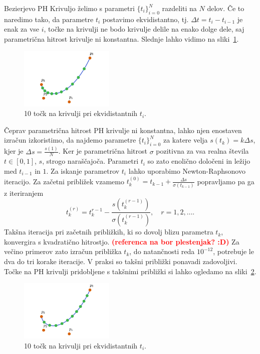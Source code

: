 \documentclass[isrm2, tisk]{fmfdelo}
\newcommand{\mycomment}[1]{\textbf{\textcolor{red}{#1}}}
\begin{document}
    Bezierjevo PH Krivuljo želimo s parametri $\{t_i\}_{i=0}^{N}$ razdeliti na $N$ delov.
    Če to naredimo tako, da parametre $t_i$ postavimo ekvidistantno, tj. $\Delta t=t_i-t_{i-1}$ je enak za vse $i$, točke na krivulji ne bodo krivulje delile na enako dolge dele, saj parametrična hitrost krivulje ni konstantna.
    Slednje lahko vidimo na sliki~\ref{fig:enakomerni-t}.
    \begin{figure}[h]
        \centering
        \includegraphics[width = 0.40\textwidth]{images/enakomerni-t}
        \caption{10 točk na krivulji pri ekvidistantnih $t_i$.}
        \label{fig:enakomerni-t}
    \end{figure}
    Čeprav parametrična hitrost PH krivulje ni konstantna, lahko njen enostaven izračun izkoristimo, da najdemo parametre $\{t_i\}^{N}_{i=0}$ za katere velja $s(t_k)=k\Delta s$, kjer je $\Delta s = \frac{s(1)}{N}$.
    Ker je parametrična hitrost $\sigma$ pozitivna za vsa realna števila $t\in[0,1]$, $s$, strogo naraščajoča.
    Parametri $t_i$ so zato enolično določeni in ležijo med $t_{i-1}$ in $1$.
    Za iskanje parametrov $t_i$ lahko uporabimo Newton-Raphsonovo iteracijo.
    Za začetni približek vzamemo $t_k^{(0)} = t_{k-1} + \frac{\Delta s}{\sigma(t_{k-1})}$ popravljamo pa ga z iteriranjem
    \[ t_k^{(r)} = t_k^{r-1} - \frac{s(t_k^{(r-1)})}{\sigma(t_k^{(r-1)})}, \quad r=1,2,\ldots .\]
    Takšna iteracija pri začetnih približkih, ki so dovolj blizu parametra $t_k$, konvergira s kvadratično hitrostjo. \mycomment{(referenca na bor plestenjak? :D)}
    Za večino primerov zato izračun približka $t_k$, do natančnosti reda $10^{-12}$, potrebuje le dva do tri korake iteracije.
    V praksi so takšni približki ponavadi zadovoljivi.
    Točke na PH krivulji pridobljene s takšnimi približki si lahko ogledamo na sliki~\ref{fig:enakomerni-s}.
    \begin{figure}[h]
        \centering
        \includegraphics[width = 0.40\textwidth]{images/enakomerni-s}
        \caption{10 točk na krivulji pri ekvidistantnih $t_i$.}
        \label{fig:enakomerni-s}
    \end{figure}
\end{document}
